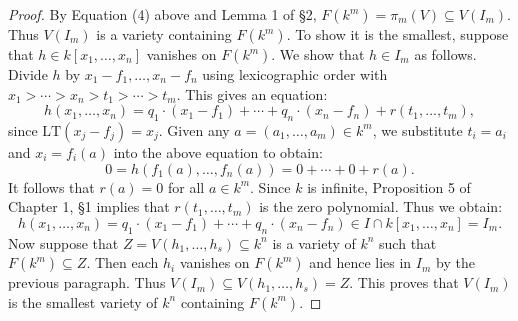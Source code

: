 \documentclass[12pt]{article}
\begin{document}
\begin{proof}
	By Equation (4) above and Lemma 1 of \S2, \( F(k^m) = \pi_m(V) \subseteq V(I_m) \). Thus \( V(I_m) \) is a variety containing \( F(k^m) \). To show it is the smallest, suppose that \( h \in k[x_1, \ldots, x_n] \) vanishes on \( F(k^m) \). We show that \( h \in I_m \) as follows. Divide \( h \) by \( x_1 - f_1, \ldots, x_n - f_n \) using lexicographic order with \( x_1 > \cdots > x_n > t_1 > \cdots > t_m \). This gives an equation:
	\[
		h(x_1, \ldots, x_n) = q_1 \cdot (x_1 - f_1) + \cdots + q_n \cdot (x_n - f_n) + r(t_1, \ldots, t_m),
	\]
	since \( \mathrm{LT}(x_j - f_j) = x_j \). Given any \( a = (a_1, \ldots, a_m) \in k^m \), we substitute \( t_i = a_i \) and \( x_i = f_i(a) \) into the above equation to obtain:
	\[
		0 = h(f_1(a), \ldots, f_n(a)) = 0 + \cdots + 0 + r(a).
	\]
	It follows that \( r(a) = 0 \) for all \( a \in k^m \). Since \( k \) is infinite, Proposition 5 of Chapter 1, \S1 implies that \( r(t_1, \ldots, t_m) \) is the zero polynomial. Thus we obtain:
	\[
		h(x_1, \ldots, x_n) = q_1 \cdot (x_1 - f_1) + \cdots + q_n \cdot (x_n - f_n) \in I \cap k[x_1, \ldots, x_n] = I_m.
	\]
	Now suppose that \( Z = V(h_1, \ldots, h_s) \subseteq k^n \) is a variety of \( k^n \) such that \( F(k^m) \subseteq Z \). Then each \( h_i \) vanishes on \( F(k^m) \) and hence lies in \( I_m \) by the previous paragraph. Thus \( V(I_m) \subseteq V(h_1, \ldots, h_s) = Z \). This proves that \( V(I_m) \) is the smallest variety of \( k^n \) containing \( F(k^m) \).
\end{proof}
\end{document}
